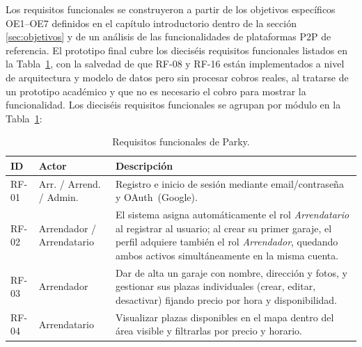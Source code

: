 Los requisitos funcionales se construyeron a partir de los objetivos específicos OE1--OE7 definidos en el capítulo introductorio dentro de la sección \ref*{sec:objetivos} y de un análisis de las funcionalidades de plataformas P2P de referencia. El prototipo final cubre los dieciséis requisitos funcionales listados en la Tabla~\ref{tab:rf}, con la salvedad de que RF-08 y RF-16 están implementados a nivel de arquitectura y modelo de datos pero sin procesar cobros reales, al tratarse de un prototipo académico y que no es necesario el cobro para mostrar la funcionalidad. Los dieciséis requisitos funcionales se agrupan por módulo en la Tabla~\ref{tab:rf}:

\begin{table}[htbp]
  \centering
  \caption{Requisitos funcionales de Parky.}
  \label{tab:rf}
  \begin{tabularx}{\textwidth}{llX}
    \toprule
    \textbf{ID} & \textbf{Actor}            & \textbf{Descripción}                                                                                                                                                                                                                                                                      \\
    \midrule
    \rowcolor{gray!5}
    RF-01       & Arr. / Arrend. / Admin.   & Registro e inicio de sesión mediante email/contraseña y OAuth~(Google).                                                                                                                                                                                                                   \\
    RF-02       & Arrendador / Arrendatario & El sistema asigna automáticamente el rol \textit{Arrendatario} al registrar al usuario; al crear su primer garaje, el perfil adquiere también el rol \textit{Arrendador}, quedando ambos activos simultáneamente en la misma cuenta.                                                      \\
    \rowcolor{gray!5}
    RF-03       & Arrendador                & Dar de alta un garaje con nombre, dirección y fotos, y gestionar sus plazas individuales (crear, editar, desactivar) fijando precio por hora y disponibilidad.                                                                                                                            \\
    RF-04       & Arrendatario              & Visualizar plazas disponibles en el mapa dentro del área visible y filtrarlas por precio y horario.                                                                                                                                                                                       \\

\end{tabularx}
\end{table}
